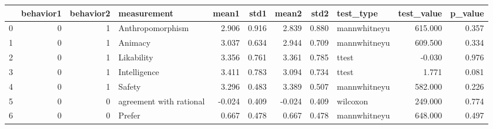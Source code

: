 \begin{tabular}{lrrlrrrrlrr}
\toprule
{} &  behavior1 &  behavior2 &              measurement &  mean1 &   std1 &  mean2 &   std2 &     test\_type &  test\_value &  p\_value \\
\midrule
0 &          0 &          1 &         Anthropomorphism &  2.906 &  0.916 &  2.839 &  0.880 &  mannwhitneyu &     615.000 &    0.357 \\
1 &          0 &          1 &                  Animacy &  3.037 &  0.634 &  2.944 &  0.709 &  mannwhitneyu &     609.500 &    0.334 \\
2 &          0 &          1 &               Likability &  3.356 &  0.761 &  3.361 &  0.785 &         ttest &      -0.030 &    0.976 \\
3 &          0 &          1 &             Intelligence &  3.411 &  0.783 &  3.094 &  0.734 &         ttest &       1.771 &    0.081 \\
4 &          0 &          1 &                   Safety &  3.296 &  0.483 &  3.389 &  0.507 &  mannwhitneyu &     582.000 &    0.226 \\
5 &          0 &          0 &  agreement with rational & -0.024 &  0.409 & -0.024 &  0.409 &      wilcoxon &     249.000 &    0.774 \\
6 &          0 &          0 &                   Prefer &  0.667 &  0.478 &  0.667 &  0.478 &  mannwhitneyu &     648.000 &    0.497 \\
\bottomrule
\end{tabular}
